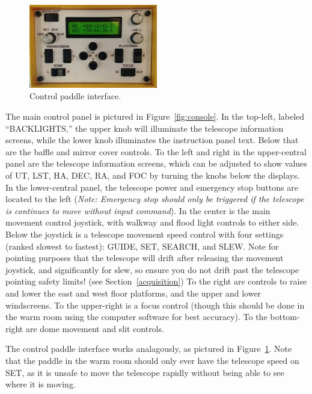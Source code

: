 \documentclass[12pt]{article}
\begin{document}
\begin{figure}[b!]
   \centering
   \includegraphics[width=0.5\textwidth]{paddle.jpg}
   \caption{Control paddle interface.\label{fig:paddle}}
\end{figure}

The main control panel is pictured in Figure~\ref{fig:console}. In the top-left, labeled ``BACKLIGHTS,'' the upper knob will illuminate the telescope information screens, while the lower knob illuminates the instruction panel text. Below that are the baffle and mirror cover controls. To the left and right in the upper-central panel are the telescope information screens, which can be adjusted to show values of UT, LST, HA, DEC, RA, and FOC by turning the knobs below the displays. In the lower-central panel, the telescope power and emergency stop buttons are located to the left (\textit{Note: Emergency stop should only be triggered if the telescope is continues to move without input command}). In the center is the main movement control joystick, with walkway and flood light controls to either side. Below the joystick is a telescope movement speed control with four settings (ranked slowest to fastest): GUIDE, SET, SEARCH, and SLEW. Note for pointing purposes that the telescope will drift after releasing the movement joystick, and significantly for slew, so ensure you do not drift past the telescope pointing safety limits! (see Section~\ref{acquisition}) To the right are controls to raise and lower the east and west floor platforms, and the upper and lower windscreens. To the upper-right is a focus control (though this should be done in the warm room using the computer software for best accuracy). To the bottom-right are dome movement and slit controls.\par
\indent The control paddle interface works analagously, as pictured in Figure~\ref{fig:paddle}. Note that the paddle in the warm room should only ever have the telescope speed on SET, as it is unsafe to move the telescope rapidly without being able to see where it is moving.\par
\end{document}
